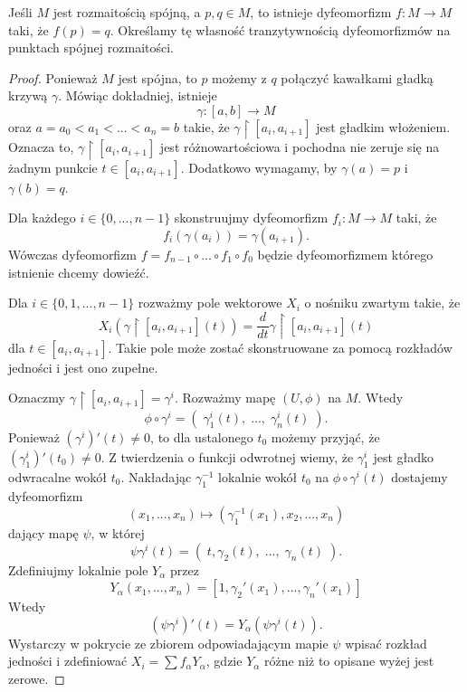 \begin{example}
  \item Jeśli $M$ jest rozmaitością spójną, a $p,q\in M$, to istnieje dyfeomorfizm $f:M\to M$ taki, że $f(p)=q$. Określamy tę własność tranzytywnością dyfeomorfizmów na punktach spójnej rozmaitości.

    \begin{proof}
      Ponieważ $M$ jest spójna, to $p$ możemy z $q$ połączyć kawałkami gładką krzywą $\gamma$. Mówiąc dokładniej, istnieje
      $$\gamma:[a,b]\to M$$
      oraz $a=a_0<a_1<...<a_n=b$ takie, że $\gamma\restriction[a_i,a_{i+1}]$ jest gładkim włożeniem. Oznacza to, $\gamma\restriction[a_i,a_{i+1}]$ jest różnowartościowa i pochodna nie zeruje się na żadnym punkcie $t\in[a_i,a_{i+1}]$. Dodatkowo wymagamy, by $\gamma(a)=p$ i $\gamma(b)=q$.

      Dla każdego $i\in\{0,...,n-1\}$ skonstruujmy dyfeomorfizm $f_i:M\to M$ taki, że 
      $$f_i(\gamma(a_i))=\gamma(a_{i+1}).$$
      Wówczas dyfeomorfizm $f=f_{n-1}\circ ...\circ f_1\circ f_0$ będzie dyfeomorfizmem którego istnienie chcemy dowieźć.

      Dla $i\in\{0,1,...,n-1\}$ rozważmy pole wektorowe $X_i$ o nośniku zwartym takie, że
      $$X_i(\gamma\restriction[a_i,a_{i+1}](t))=\frac{d}{dt}\gamma\restriction[a_i,a_{i+1}](t)$$
      dla $t\in[a_i,a_{i+1}]$. Takie pole może zostać skonstruowane za pomocą rozkładów jedności i jest ono zupełne.


      Oznaczmy $\gamma\restriction[a_i,a_{i+1}]=\gamma^i$. Rozważmy mapę $(U,\phi)$ na $M$. Wtedy 
      $$\phi\circ\gamma^i=(\;\gamma_1^i(t),\;...,\;\gamma_n^i(t)\;).$$
      Ponieważ $(\gamma^i)'(t)\neq 0$, to dla ustalonego $t_0$ możemy przyjąć, że $(\gamma_1^i)'(t_0)\neq 0$. Z twierdzenia o funkcji odwrotnej wiemy, że $\gamma_1^i$ jest gładko odwracalne wokół $t_0$. Nakładając $\gamma_1^{-1}$ lokalnie wokół $t_0$ na $\phi\circ\gamma^i(t)$ dostajemy dyfeomorfizm
      $$(x_1,...,x_n)\mapsto(\gamma_1^{-1}(x_1),x_2,...,x_n)$$
      dający mapę $\psi$, w której 
      $$\psi\gamma^i(t)=(\;t,\gamma_2(t),\;...,\;\gamma_n(t)\;).$$
      Zdefiniujmy lokalnie pole $Y_\alpha$ przez
      $$Y_\alpha(x_1,...,x_n)=[1,\gamma_2'(x_1),...,\gamma_n'(x_1)]$$
      Wtedy 
      $$(\psi\gamma^i)'(t)=Y_\alpha(\psi\gamma^i(t)).$$
      Wystarczy w pokrycie ze zbiorem odpowiadającym mapie $\psi$ wpisać rozkład jedności i zdefiniować $X_i=\sum f_\alpha Y_\alpha$, gdzie $Y_\alpha$ różne niż to opisane wyżej jest zerowe.


\end{proof}
\end{example}
